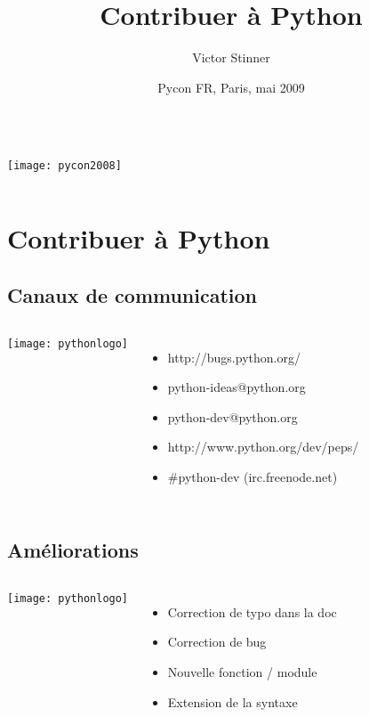 \documentclass[handout]{beamer}
\title[De la naissance à la mort d'un ticket]{Contribuer à Python}
\author{Victor Stinner}
\date{Pycon FR, Paris, mai 2009}
\begin{document}
\begin{frame}
    \begin{columns}[c]
            \titlepage

            \texttt{[image: pycon2008]}
    \end{columns}
\end{frame}

\section{Contribuer à Python}

\subsection{Canaux de communication}
\frame
{
    \begin{columns}[c]
            \texttt{[image: pythonlogo]}
            \begin{itemize}
            \item http://bugs.python.org/
            \item python-ideas@python.org
            \item python-dev@python.org
            \item http://www.python.org/dev/peps/
            \item \#python-dev (irc.freenode.net)
            \end{itemize}
    \end{columns}
}


\subsection{Améliorations}
\frame
{
    \begin{columns}[c]
            \texttt{[image: pythonlogo]}
            \begin{itemize}
            \item Correction de typo dans la doc
            \item Correction de bug
            \item Nouvelle fonction / module
            \item Extension de la syntaxe
            \end{itemize}
    \end{columns}
}
\end{document}
